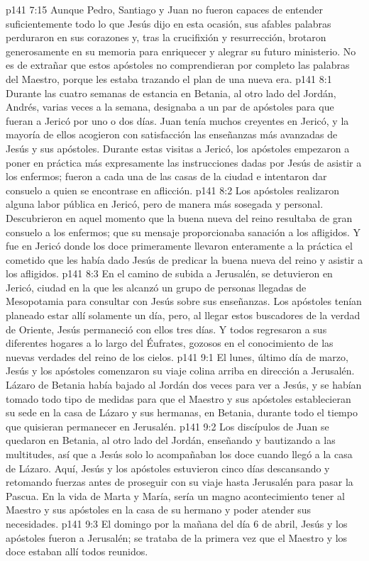 \vs p141 7:15 Aunque Pedro, Santiago y Juan no fueron capaces de entender suficientemente todo lo que Jesús dijo en esta ocasión, sus afables palabras perduraron en sus corazones y, tras la crucifixión y resurrección, brotaron generosamente en su memoria para enriquecer y alegrar su futuro ministerio. No es de extrañar que estos apóstoles no comprendieran por completo las palabras del Maestro, porque les estaba trazando el plan de una nueva era.
\vs p141 8:1 Durante las cuatro semanas de estancia en Betania, al otro lado del Jordán, Andrés, varias veces a la semana, designaba a un par de apóstoles para que fueran a Jericó por uno o dos días. Juan tenía muchos creyentes en Jericó, y la mayoría de ellos acogieron con satisfacción las enseñanzas más avanzadas de Jesús y sus apóstoles. Durante estas visitas a Jericó, los apóstoles empezaron a poner en práctica más expresamente las instrucciones dadas por Jesús de asistir a los enfermos; fueron a cada una de las casas de la ciudad e intentaron dar consuelo a quien se encontrase en aflicción.
\vs p141 8:2 Los apóstoles realizaron alguna labor pública en Jericó, pero de manera más sosegada y personal. Descubrieron en aquel momento que la buena nueva del reino resultaba de gran consuelo a los enfermos; que su mensaje proporcionaba sanación a los afligidos. Y fue en Jericó donde los doce primeramente llevaron enteramente a la práctica el cometido que les había dado Jesús de predicar la buena nueva del reino y asistir a los afligidos.
\vs p141 8:3 En el camino de subida a Jerusalén, se detuvieron en Jericó, ciudad en la que les alcanzó un grupo de personas llegadas de Mesopotamia para consultar con Jesús sobre sus enseñanzas. Los apóstoles tenían planeado estar allí solamente un día, pero, al llegar estos buscadores de la verdad de Oriente, Jesús permaneció con ellos tres días. Y todos regresaron a sus diferentes hogares a lo largo del Éufrates, gozosos en el conocimiento de las nuevas verdades del reino de los cielos.
\vs p141 9:1 El lunes, último día de marzo, Jesús y los apóstoles comenzaron su viaje colina arriba en dirección a Jerusalén. Lázaro de Betania había bajado al Jordán dos veces para ver a Jesús, y se habían tomado todo tipo de medidas para que el Maestro y sus apóstoles establecieran su sede en la casa de Lázaro y sus hermanas, en Betania, durante todo el tiempo que quisieran permanecer en Jerusalén.
\vs p141 9:2 Los discípulos de Juan se quedaron en Betania, al otro lado del Jordán, enseñando y bautizando a las multitudes, así que a Jesús solo lo acompañaban los doce cuando llegó a la casa de Lázaro. Aquí, Jesús y los apóstoles estuvieron cinco días descansando y retomando fuerzas antes de proseguir con su viaje hasta Jerusalén para pasar la Pascua. En la vida de Marta y María, sería un magno acontecimiento tener al Maestro y sus apóstoles en la casa de su hermano y poder atender sus necesidades.
\vs p141 9:3 El domingo por la mañana del día 6 de abril, Jesús y los apóstoles fueron a Jerusalén; se trataba de la primera vez que el Maestro y los doce estaban allí todos reunidos.
